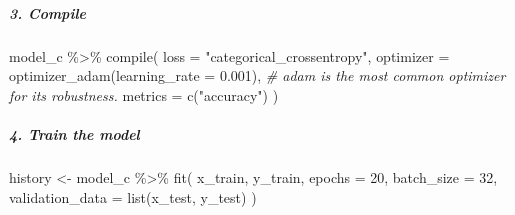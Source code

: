 \documentclass[
]{article}
\newenvironment{Shaded}{\begin{snugshade}}{\end{snugshade}}
\newcommand{\AttributeTok}[1]{\textcolor[rgb]{0.77,0.63,0.00}{#1}}
\newcommand{\CommentTok}[1]{\textcolor[rgb]{0.56,0.35,0.01}{\textit{#1}}}
\newcommand{\DecValTok}[1]{\textcolor[rgb]{0.00,0.00,0.81}{#1}}
\newcommand{\FloatTok}[1]{\textcolor[rgb]{0.00,0.00,0.81}{#1}}
\newcommand{\FunctionTok}[1]{\textcolor[rgb]{0.00,0.00,0.00}{#1}}
\newcommand{\NormalTok}[1]{#1}
\newcommand{\OtherTok}[1]{\textcolor[rgb]{0.56,0.35,0.01}{#1}}
\newcommand{\SpecialCharTok}[1]{\textcolor[rgb]{0.00,0.00,0.00}{#1}}
\newcommand{\StringTok}[1]{\textcolor[rgb]{0.31,0.60,0.02}{#1}}
\begin{document}
\hypertarget{compile-1}{%
\subparagraph{3. Compile}\label{compile-1}}

\begin{Shaded}
\begin{Highlighting}[]
\NormalTok{model\_c }\SpecialCharTok{\%\textgreater{}\%} \FunctionTok{compile}\NormalTok{(}
  \AttributeTok{loss =} \StringTok{"categorical\_crossentropy"}\NormalTok{,}
  \AttributeTok{optimizer =} \FunctionTok{optimizer\_adam}\NormalTok{(}\AttributeTok{learning\_rate =} \FloatTok{0.001}\NormalTok{),  }\CommentTok{\# adam is the most common optimizer for its robustness.}
  \AttributeTok{metrics =} \FunctionTok{c}\NormalTok{(}\StringTok{"accuracy"}\NormalTok{)}
\NormalTok{)}
\end{Highlighting}
\end{Shaded}

\hypertarget{train-the-model-1}{%
\subparagraph{4. Train the model}\label{train-the-model-1}}

\begin{Shaded}
\begin{Highlighting}[]
\NormalTok{history }\OtherTok{\textless{}{-}}\NormalTok{ model\_c }\SpecialCharTok{\%\textgreater{}\%} \FunctionTok{fit}\NormalTok{(}
\NormalTok{  x\_train, y\_train,}
  \AttributeTok{epochs =} \DecValTok{20}\NormalTok{,}
  \AttributeTok{batch\_size =} \DecValTok{32}\NormalTok{,}
  \AttributeTok{validation\_data =} \FunctionTok{list}\NormalTok{(x\_test, y\_test)}
\NormalTok{)}
\end{Highlighting}
\end{Shaded}
\end{document}
